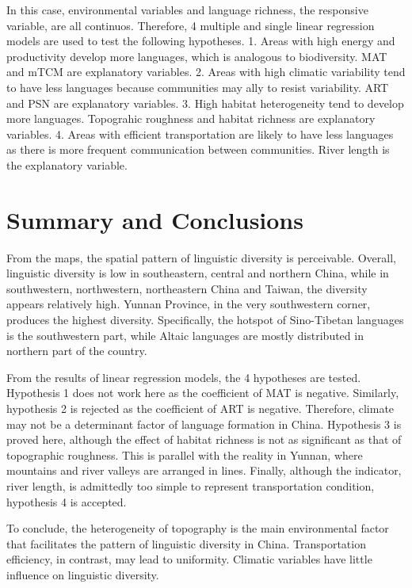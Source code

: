\documentclass[12pt,]{article}
\begin{document}
In this case, environmental variables and language richness, the
responsive variable, are all continuos. Therefore, 4 multiple and single
linear regression models are used to test the following hypotheses. 1.
Areas with high energy and productivity develop more languages, which is
analogous to biodiversity. MAT and mTCM are explanatory variables. 2.
Areas with high climatic variability tend to have less languages because
communities may ally to resist variability. ART and PSN are explanatory
variables. 3. High habitat heterogeneity tend to develop more languages.
Topograhic roughness and habitat richness are explanatory variables. 4.
Areas with efficient transportation are likely to have less languages as
there is more frequent communication between communities. River length
is the explanatory variable.

\newpage

\section{Summary and Conclusions}\label{summary-and-conclusions}

 From the maps, the spatial pattern of linguistic diversity is
perceivable. Overall, linguistic diversity is low in southeastern,
central and northern China, while in southwestern, northwestern,
northeastern China and Taiwan, the diversity appears relatively high.
Yunnan Province, in the very southwestern corner, produces the highest
diversity. Specifically, the hotspot of Sino-Tibetan languages is the
southwestern part, while Altaic languages are mostly distributed in
northern part of the country.

From the results of linear regression models, the 4 hypotheses are
tested. Hypothesis 1 does not work here as the coefficient of MAT is
negative. Similarly, hypothesis 2 is rejected as the coefficient of ART
is negative. Therefore, climate may not be a determinant factor of
language formation in China. Hypothesis 3 is proved here, although the
effect of habitat richness is not as significant as that of topographic
roughness. This is parallel with the reality in Yunnan, where mountains
and river valleys are arranged in lines. Finally, although the
indicator, river length, is admittedly too simple to represent
transportation condition, hypothesis 4 is accepted.

To conclude, the heterogeneity of topography is the main environmental
factor that facilitates the pattern of linguistic diversity in China.
Transportation efficiency, in contrast, may lead to uniformity. Climatic
variables have little influence on linguistic diversity.
\end{document}
